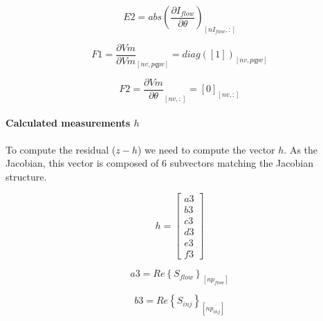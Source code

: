 \documentclass[nols,a4paper,twoside,notoc,fleqn]{tufte-book}
\begin{document}

\begin{equation}
E2 = abs\left(\frac{\partial I_{flow}}{\partial \theta}\right)_{[nI_{flow}, :]}
\end{equation}

\begin{equation}
F1 = \frac{\partial Vm}{\partial Vm}_{[nv, pqpv]} = diag([1])_{[nv, pqpv]}
\end{equation}


\begin{equation}
F2 = \frac{\partial Vm}{\partial \theta}_{[nv, :]}= [0]_{[nv, :]}
\end{equation}

\paragraph{Calculated measurements $h$}

To compute the residual ($z-h$) we need to compute the vector $h$. As the Jacobian, this vector is composed of 6 subvectors matching the Jacobian structure.

\begin{equation}
h=
\left[
\begin{array}{cc}
a3 \\
b3 \\
c3 \\
d3 \\
e3 \\
f3
\end{array}
\right]
\label{SE_measurements_vector}
\end{equation}


\begin{equation}
a3 = Re\left\{ S_{flow}\right\}_{[np_{flow}]}
\end{equation}

\begin{equation}
b3 = Re\left\{S_{inj}\right\}_{[np_{inj}]}
\end{equation}



\end{document}
